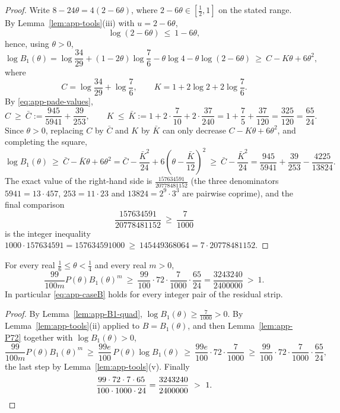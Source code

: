 \begin{proof}
Write $8-24\theta=4(2-6\theta)$, where $2-6\theta\in[\frac12,1]$ on the
stated range.  By Lemma~\ref{lem:app-tools}(iii) with $u=2-6\theta$,
\[
        \log(2-6\theta)\ \le\ 1-6\theta,
\]
hence, using $\theta>0$,
\[
        \log B_1(\theta)
        =\log\frac{34}{29}+(1-2\theta)\log\frac76
        -\theta\log4-\theta\log(2-6\theta)
        \ \ge\ C-K\theta+6\theta^2,
\]
where
\[
        C=\log\frac{34}{29}+\log\frac76,
        \qquad
        K=1+2\log2+2\log\frac76 .
\]
By \eqref{eq:app-pade-values},
\[
        C\ \ge\ \bar C:=\frac{945}{5941}+\frac{39}{253},
        \qquad
        K\ \le\ \bar K:=1+2\cdot\frac{7}{10}+2\cdot\frac{37}{240}
        =1+\frac75+\frac{37}{120}=\frac{325}{120}=\frac{65}{24}.
\]
Since $\theta>0$, replacing $C$ by $\bar C$ and $K$ by $\bar K$ can only
decrease $C-K\theta+6\theta^2$, and completing the square,
\[
        \log B_1(\theta)
        \ \ge\ \bar C-\bar K\theta+6\theta^2
        =\bar C-\frac{\bar K^2}{24}+6\left(\theta-\frac{\bar K}{12}\right)^2
        \ \ge\ \bar C-\frac{\bar K^2}{24}
        =\frac{945}{5941}+\frac{39}{253}-\frac{4225}{13824}.
\]
The exact value of the right-hand side is
$\frac{157634591}{20778481152}$ (the three denominators
$5941=13\cdot457$, $253=11\cdot23$ and $13824=2^9\cdot3^3$ are pairwise
coprime), and the final comparison
\[
        \frac{157634591}{20778481152}\ \ge\ \frac{7}{1000}
\]
is the integer inequality
$1000\cdot157634591=157634591000\ \ge\ 145449368064=7\cdot20778481152$.
\end{proof}

\begin{proposition}\label{prop:app-caseB-full}
For every real $\frac16\le\theta<\frac14$ and every real $m>0$,
\[
        \frac{99}{100m}P(\theta)B_1(\theta)^m\ \ge\
        \frac{99}{100}\cdot72\cdot\frac{7}{1000}\cdot\frac{65}{24}
        =\frac{3243240}{2400000}\ >\ 1 .
\]
In particular \eqref{eq:app-caseB} holds for every integer pair of the
residual strip.
\end{proposition}

\begin{proof}
By Lemma~\ref{lem:app-B1-quad}, $\log B_1(\theta)\ge\frac7{1000}>0$.  By
Lemma~\ref{lem:app-tools}(ii) applied to $B=B_1(\theta)$, and then
Lemma~\ref{lem:app-P72} together with $\log B_1(\theta)>0$,
\[
        \frac{99}{100m}P(\theta)B_1(\theta)^m
        \ \ge\ \frac{99e}{100}\,P(\theta)\log B_1(\theta)
        \ \ge\ \frac{99e}{100}\cdot72\cdot\frac{7}{1000}
        \ \ge\ \frac{99}{100}\cdot72\cdot\frac{7}{1000}\cdot\frac{65}{24},
\]
the last step by Lemma~\ref{lem:app-tools}(v).  Finally
\[
        \frac{99\cdot72\cdot7\cdot65}{100\cdot1000\cdot24}
        =\frac{3243240}{2400000}\ >\ 1 . \qedhere
\]
\end{proof}


